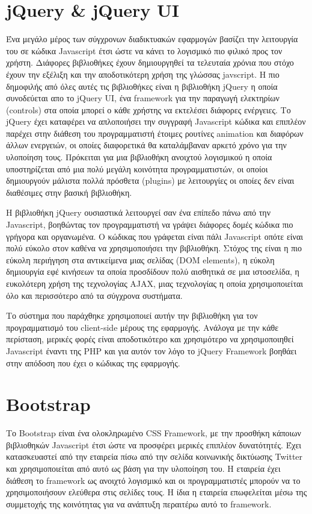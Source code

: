 \section {jQuery \& jQuery UI}
Ένα μεγάλο μέρος των σύγχρονων διαδικτυακών εφαρμογών βασίζει την λειτουργία του σε κώδικα Javascript έτσι ώστε να κάνει το λογισμικό πιο φιλικό προς τον χρήστη. Διάφορες βιβλιοθήκες έχουν δημιουργηθεί τα τελευταία χρόνια που στόχο έχουν την εξέλιξη και την αποδοτικότερη χρήση της γλώσσας javscript. Η πιο δημοφιλής από όλες αυτές τις βιβλιοθήκες είναι η βιβλιοθήκη jQuery η οποία συνοδεύεται απο το jQuery UI, ένα framework για την παραγωγή ελεκτηρίων (controls) στα οποία μπορεί ο κάθε χρήστης να εκτελέσει διάφορες ενέργειες. Το jQuery έχει καταφέρει να απλοποιήσει την συγγραφή Javascript κώδικα και επιπλέον παρέχει στην διάθεση του προγραμματιστή έτοιμες ρουτίνες animation και διαφόρων άλλων ενεργειών, οι οποίες διαφορετικά θα καταλάμβαναν αρκετό χρόνο για την υλοποίηση τους. Πρόκειται για μια βιβλιοθήκη ανοιχτού λογισμικού η οποία υποστηρίζεται από μια πολύ μεγάλη κοινότητα προγραμματιστών, οι οποίοι δημιουργούν μάλιστα πολλά πρόσθετα (plugins) με λειτουργίες οι οποίες δεν είναι διαθέσιμες στην βασική βιβλιοθήκη.

Η βιβλιοθήκη jQuery ουσιαστικά λειτουργεί σαν ένα επίπεδο πάνω από την Javascript, βοηθώντας τον προγραμματιστή να γράψει διάφορες δομές κώδικα πιο γρήγορα και οργανωμένα. Ο κώδικας που γράφεται είναι πάλι Javascript οπότε είναι πολύ εύκολο στον καθένα να χρησιμοποιήσει την βιβλιοθήκη. Στόχος της είναι η πιο εύκολη περιήγηση στα αντικείμενα μιας σελίδας (DOM elements), η εύκολη δημιουργία εφέ κινήσεων τα οποία προσδίδουν πολύ αισθητικά σε μια ιστοσελίδα, η ευκολότερη χρήση της τεχνολογίας AJAX, μιας τεχνολογίας η οποία χρησιμοποιείται όλο και περισσότερο από τα σύγχρονα συστήματα.

Το σύστημα που παράχθηκε χρησιμοποιεί αυτήν την βιβλιοθήκη για τον προγραμματισμό του client-side μέρους της εφαρμογής. Ανάλογα με την κάθε περίσταση, μερικές φορές είναι αποδοτικότερο και χρησιμότερο να χρησιμοποιηθεί Javascript έναντι της PHP και για αυτόν τον λόγο το jQuery Framework βοηθάει στην απόδοση που έχει ο κώδικας της εφαρμογής.

\section {Bootstrap}
Το Bootstrap είναι ένα ολοκληρωμένο CSS Framework, με την προσθήκη κάποιων βιβλιοθηκών Javascript έτσι ώστε να προσφέρει μερικές επιπλέον δυνατότητές. Έχει κατασκευαστεί από την εταιρεία πίσω από την σελίδα κοινωνικής δικτύωσης Twitter και χρησιμοποιείται από αυτό ως βάση για την υλοποίηση του. Η εταιρεία έχει διάθεση το framework ως ανοιχτό λογισμικό και οι προγραμματιστές μπορούν να το χρησιμοποιήσουν ελεύθερα στις σελίδες τους. Η ίδια η εταιρεία επωφελείται μέσω της συμμετοχής της κοινότητας για να ανάπτυξη περαιτέρω αυτό το framework.

